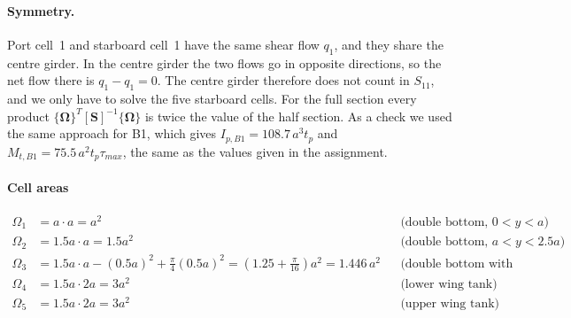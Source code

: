 \paragraph{Symmetry.}
Port cell~1 and starboard cell~1 have the same shear flow $q_1$, and they share the centre girder. In the centre girder the two flows go in opposite directions, so the net flow there is $q_1-q_1=0$. The centre girder therefore does not count in $S_{11}$, and we only have to solve the five starboard cells. For the full section every product $\{\boldsymbol{\Omega}\}^T[\mathbf{S}]^{-1}\{\boldsymbol{\Omega}\}$ is twice the value of the half section. As a check we used the same approach for B1, which gives $I_{p,B1}=108.7\,a^3t_p$ and $M_{t,B1}=75.5\,a^2t_p\tau_{max}$, the same as the values given in the assignment.

\paragraph{Cell areas}
\begin{align*}
\Omega_1 &= a\cdot a = a^2 && \text{(double bottom, } 0<y<a\text{)}\\
\Omega_2 &= 1.5a\cdot a = 1.5a^2 && \text{(double bottom, } a<y<2.5a\text{)}\\
\Omega_3 &= 1.5a\cdot a - \left(0.5a\right)^2 + \tfrac{\pi}{4}(0.5a)^2
          = \left(1.25+\tfrac{\pi}{16}\right)a^2 = 1.446\,a^2
          && \text{(double bottom with bilge)}\\
\Omega_4 &= 1.5a\cdot 2a = 3a^2 && \text{(lower wing tank)}\\
\Omega_5 &= 1.5a\cdot 2a = 3a^2 && \text{(upper wing tank)}
\end{align*}

